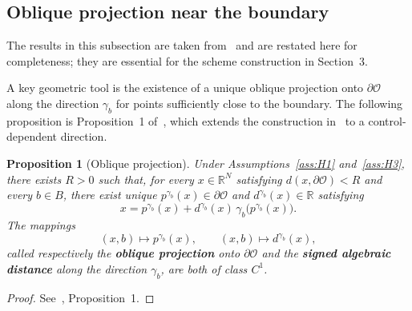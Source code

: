 \documentclass[10pt,a4paper]{amsart}
\newtheorem{proposition}[theorem]{Proposition}
\newcommand{\R}{\mathbb{R}}
\newcommand{\cO}{\mathcal{O}}
\begin{document}
	\subsection{Oblique projection near the boundary}
	
	The results in this subsection are taken from~\cite{CalzolaEtAl2023} and are restated here for completeness; they are essential for the scheme construction in Section~3.
	
	A key geometric tool is the existence of a unique oblique projection onto $\partial\cO$ along the direction $\gamma_b$ for points sufficiently close to the boundary.  The following proposition is Proposition~1 of~\cite{CalzolaEtAl2023}, which extends the construction in~\cite[Section~1.2]{Gobet2001} to a control-dependent direction.
	
	\begin{proposition}[Oblique projection] \upshape\label{prop:oblique-proj}
		Under Assumptions~\ref{ass:H1} and~\ref{ass:H3}, there exists $R>0$ such that, for every $x\in\R^N$ satisfying $d(x,\partial\cO)<R$ and every $b\in B$, there exist unique $p^{\gamma_b}(x)\in\partial\cO$ and $d^{\gamma_b}(x)\in\R$ satisfying
		\begin{equation}
			x = p^{\gamma_b}(x) + d^{\gamma_b}(x)\,\gamma_b\!\big(p^{\gamma_b}(x)\big).
			\label{eq:oblique-decomp}
		\end{equation}
		The mappings
		\[
		(x,b)\longmapsto p^{\gamma_b}(x),\qquad (x,b)\longmapsto d^{\gamma_b}(x),
		\]
		called respectively the \textbf{oblique projection} onto $\partial\cO$ and the \textbf{signed algebraic distance} along the direction $\gamma_b$, are both of class $C^1$.
	\end{proposition}
	\begin{proof} \upshape See~\cite{CalzolaEtAl2023}, Proposition~1.\end{proof}
	
\end{document}
